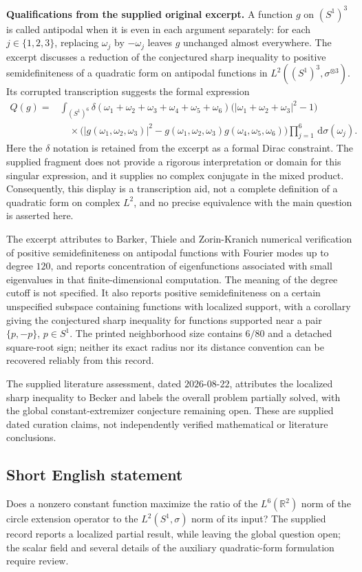 \documentclass[11pt]{article}
\newcommand{\R}{\mathbb{R}}
\newcommand{\dd}{\,\mathrm{d}}
\begin{document}
\textbf{Qualifications from the supplied original excerpt.} A function \(g\) on \((S^1)^3\) is called antipodal when it is even in each argument separately: for each \(j\in\{1,2,3\}\), replacing \(\omega_j\) by \(-\omega_j\) leaves \(g\) unchanged almost everywhere. The excerpt discusses a reduction of the conjectured sharp inequality to positive semidefiniteness of a quadratic form on antipodal functions in \(L^2((S^1)^3,\sigma^{\otimes3})\). Its corrupted transcription suggests the formal expression
\[
\begin{aligned}
Q(g)={}&\int_{(S^1)^6}
\delta(\omega_1+\omega_2+\omega_3+\omega_4+\omega_5+\omega_6)
\bigl(|\omega_1+\omega_2+\omega_3|^2-1\bigr)\\
&\quad\times\bigl(|g(\omega_1,\omega_2,\omega_3)|^2
-g(\omega_1,\omega_2,\omega_3)g(\omega_4,\omega_5,\omega_6)\bigr)
\prod_{j=1}^{6}\dd\sigma(\omega_j).
\end{aligned}
\]
Here the \(\delta\) notation is retained from the excerpt as a formal Dirac constraint. The supplied fragment does not provide a rigorous interpretation or domain for this singular expression, and it supplies no complex conjugate in the mixed product. Consequently, this display is a transcription aid, not a complete definition of a quadratic form on complex \(L^2\), and no precise equivalence with the main question is asserted here.

The excerpt attributes to Barker, Thiele and Zorin-Kranich numerical verification of positive semidefiniteness on antipodal functions with Fourier modes up to degree \(120\), and reports concentration of eigenfunctions associated with small eigenvalues in that finite-dimensional computation. The meaning of the degree cutoff is not specified. It also reports positive semidefiniteness on a certain unspecified subspace containing functions with localized support, with a corollary giving the conjectured sharp inequality for functions supported near a pair \(\{p,-p\}\), \(p\in S^1\). The printed neighborhood size contains \(6/80\) and a detached square-root sign; neither its exact radius nor its distance convention can be recovered reliably from this record.

The supplied literature assessment, dated \(2026\text{-}08\text{-}22\), attributes the localized sharp inequality to Becker and labels the overall problem partially solved, with the global constant-extremizer conjecture remaining open. These are supplied dated curation claims, not independently verified mathematical or literature conclusions.
\subsection{Short English statement}
Does a nonzero constant function maximize the ratio of the \(L^6(\R^2)\) norm of the circle extension operator to the \(L^2(S^1,\sigma)\) norm of its input? The supplied record reports a localized partial result, while leaving the global question open; the scalar field and several details of the auxiliary quadratic-form formulation require review.
\end{document}
